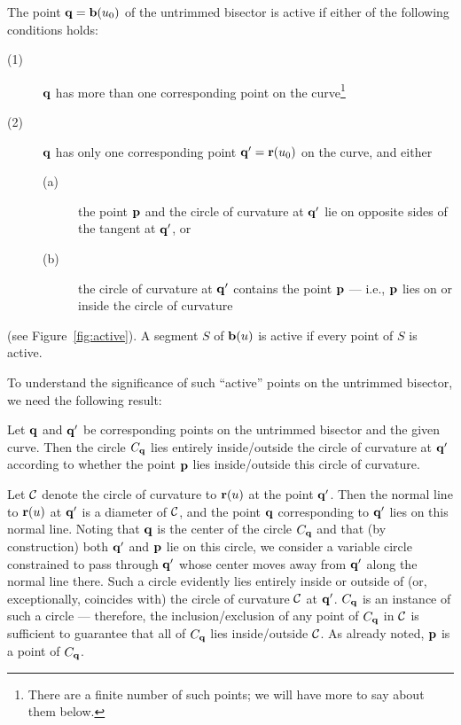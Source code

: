 \begin{dfn}
The point ${\bf q} = {\bf b}(u_{0})$ of the untrimmed bisector is
{\rm active} if either of the following conditions holds:
\begin{description}
\item[{\rm (1)}]
        ${\bf q}$ has more than one corresponding point on the
        curve\footnote{There are a finite number of such points;
        we will have more to say about them below.}
\item[{\rm (2)}]
        ${\bf q}$ has only one corresponding point ${\bf q}' =
        {\bf r}(u_0)$ on the curve, and either
\begin{description}
\item[{\rm (a)}]
        the point ${\bf p}$ and the circle of curvature at ${\bf q}'$
        lie on opposite sides of the tangent at ${\bf q'}$, or
\item[{\rm (b)}]
        the circle of curvature at ${\bf q}'$ contains the point ${\bf p}$
        --- i.e., ${\bf p}$ lies on or inside the circle of curvature
\end{description}
\end{description}
(see Figure~\ref{fig:active}). A segment $S$ of ${\bf b}(u)$ is active
if every point of $S$ is active.
\end{dfn}


To understand the significance of such ``active'' points on the untrimmed
bisector, we need the following result:

\begin{lma} \label{lma:circles}
Let ${\bf q}$ and ${\bf q}'$ be corresponding points on the untrimmed
bisector and the given curve. Then the circle $C_{\bf q}$ lies entirely
inside/outside the circle of curvature at ${\bf q}'$ according to whether
the point ${\bf p}$ lies inside/outside this circle of curvature.
\end{lma}
\prf
Let ${\cal C}$ denote the circle of curvature to ${\bf r}(u)$ at the
point ${\bf q}'$. Then the normal line to ${\bf r}(u)$ at ${\bf q}'$
is a diameter of ${\cal C}$, and the point ${\bf q}$ corresponding
to ${\bf q}'$ lies on this normal line. Noting that ${\bf q}$ is
the center of the circle $C_{\bf q}$ and that (by construction) both
${\bf q}'$ and ${\bf p}$ lie on this circle, we consider a variable
circle constrained to pass through ${\bf q}'$ whose center moves away
from ${\bf q}'$ along the normal line there. Such a circle evidently
lies entirely inside or outside of (or, exceptionally, coincides with)
the circle of curvature ${\cal C}$ at ${\bf q}'$. $C_{\bf q}$ is an
instance of such a circle --- therefore, the inclusion/exclusion of
any point of $C_{\bf q}$ in ${\cal C}$ is sufficient to guarantee that
all of $C_{\bf q}$ lies inside/outside ${\cal C}$. As already noted,
${\bf p}$ is a point of $C_{\bf q}$.
\QED

